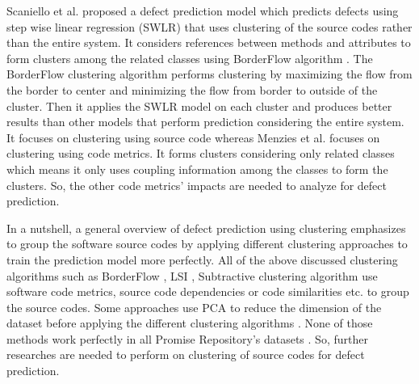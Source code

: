 \documentclass[12pt]{report}
\begin{document}
Scaniello et al. \cite{scanniello2013class} proposed a defect prediction model which predicts defects using step wise linear regression (SWLR) that uses clustering of the source codes rather than the entire system. It considers references between methods and attributes to form clusters among the related classes using BorderFlow algorithm \cite{ngomo2010low}. The BorderFlow clustering algorithm performs clustering by maximizing the flow from the border to center and minimizing the flow from border to outside of the cluster. Then it applies the SWLR model on each cluster and produces better results than other models that perform prediction considering the entire system. It focuses on clustering using source code whereas Menzies et al. \cite{menzies2013local,menzies2011local} focuses on clustering using code metrics. It forms clusters considering only related classes which means it only uses coupling information among the classes to form the clusters. So, the other code metrics' impacts are needed to analyze for defect prediction.  

In a nutshell, a general overview of defect prediction using clustering emphasizes to group the software source codes by applying different clustering approaches to train the prediction model more perfectly. All of the above discussed clustering algorithms such as BorderFlow \cite{scanniello2013class}, LSI \cite{tan2011assessing}, Subtractive clustering algorithm \cite{sidhu2010subtractive} use software code metrics, source code dependencies or code similarities etc. to group the source codes. Some approaches use PCA to reduce the dimension of the dataset before applying the different clustering algorithms \cite{menzies2011local,menzies2013local,sidhu2010subtractive}. None of those methods work perfectly in all Promise Repository's datasets \cite{promise12}. So, further researches are needed to perform on clustering of source codes for defect prediction.



\end{document}
